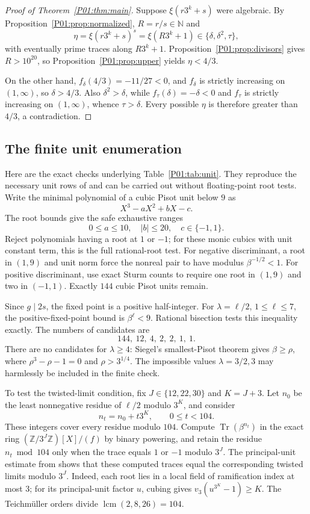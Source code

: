 \documentclass[11pt,a4paper]{article}
\theoremstyle{definition}\newtheorem{definition}[theorem]{Definition}
\theoremstyle{remark}\newtheorem{remark}[theorem]{Remark}
\newcommand{\N}{\mathbb N}\newcommand{\Z}{\mathbb Z}\newcommand{\Q}{\mathbb Q}
\DeclareMathOperator{\Tr}{Tr}\DeclareMathOperator{\tr}{tr}\DeclareMathOperator{\Nm}{N}
\begin{document}
\begin{proof}[Proof of Theorem~\ref{P01:thm:main}]
Suppose $\xi(r3^k+s)$ were algebraic. By
Proposition~\ref{P01:prop:normalized}, $R=r/s\in\N$ and
\[
 \eta=\xi(r3^k+s)^s=\xi(R3^k+1)
                 \in\{\delta,\delta^2,\tau\},
\]
with eventually prime traces along $R3^k+1$.
Proposition~\ref{P01:prop:divisors} gives $R>10^{20}$, so
Proposition~\ref{P01:prop:upper} yields $\eta<4/3$.

On the other hand, $f_\delta(4/3)=-11/27<0$, and
$f_\delta$ is strictly increasing on $(1,\infty)$, so $\delta>4/3$.
Also $\delta^2>\delta$, while
$f_\tau(\delta)=-\delta<0$ and $f_\tau$ is strictly increasing on
$(1,\infty)$, whence $\tau>\delta$.
Every possible $\eta$ is therefore greater than $4/3$, a contradiction.
\end{proof}

\subsection{The finite unit enumeration}\label{P01:sec:enumeration}

Here are the exact checks underlying Table~\ref{P01:tab:unit}.
They reproduce the necessary unit rows of \cite{K064} and can be
carried out without floating-point root tests.
Write the minimal polynomial of a cubic Pisot unit below $9$ as
\[
                     X^3-aX^2+bX-c.
\]
The root bounds give the safe exhaustive ranges
\[
                0\leq a\leq10,\quad |b|\leq20,\quad c\in\{-1,1\}.
\]
Reject polynomials having a root at $1$ or $-1$; for these monic
cubics with unit constant term, this is the full rational-root test.
For negative discriminant, a root in $(1,9)$ and unit norm force the
nonreal pair to have modulus $\beta^{-1/2}<1$.
For positive discriminant, use exact Sturm counts to require one root
in $(1,9)$ and two in $(-1,1)$.
Exactly $144$ cubic Pisot units remain.

Since $g\mid2s$, the fixed point is a positive half-integer.
For $\lambda=\ell/2$, $1\leq\ell\leq7$, the positive-fixed-point bound
is $\beta^\ell<9$. Rational bisection tests this inequality exactly.
The numbers of candidates are
\[
                           144,\ 12,\ 4,\ 2,\ 2,\ 1,\ 1.
\]
There are no candidates for $\lambda\geq4$: Siegel's smallest-Pisot
theorem \cite{Siegel} gives $\beta\geq\rho$, where
$\rho^3-\rho-1=0$ and $\rho>3^{1/4}$.
The impossible values $\lambda=3/2,3$ may harmlessly be included in
the finite check.

To test the twisted-limit condition, fix $J\in\{12,22,30\}$ and
$K=J+3$. Let $n_0$ be the least nonnegative residue of
$\ell/2$ modulo $3^K$, and consider
\[
                 n_t=n_0+t3^K,\qquad 0\leq t<104.
\]
These integers cover every residue modulo $104$.
Compute $\Tr(\beta^{n_t})$ in the exact ring
$(\Z/3^J\Z)[X]/(f)$ by binary powering, and retain the residue
$n_t\bmod104$ only when the trace equals $1$ or $-1$ modulo $3^J$.
The principal-unit estimate from \cite{K064} shows that these
computed traces equal the corresponding twisted limits modulo $3^J$.
Indeed, each root lies in a local field of ramification index at most
$3$; for its principal-unit factor $u$, cubing gives
$v_3(u^{3^K}-1)\geq K$.
The Teichm\"uller orders divide
$\operatorname{lcm}(2,8,26)=104$.
\end{document}
